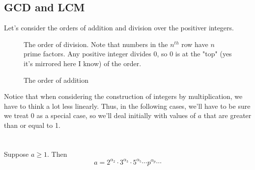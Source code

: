 \documentclass[10pt]{article}
\theoremstyle{definition}
\begin{document}
\subsection{GCD and LCM}
Let's consider the orders of addition and division over the positiver integers.  
\begin{figure}[H]
\begin{minipage}{.5\textwidth}
\centering
{}
\caption{The order of division.  Note that numbers in the $n^{th}$ row have $n$ prime factors.  Any positive integer divides $0$, so $0$ is at the "top" (yes it's mirrored here I know) of the order.}
\end{minipage}
\begin{minipage}{.5\textwidth}
\centering
{}
\caption{The order of addition}
\end{minipage}
\end{figure}
Notice that when considering the construction of integers by multiplication, we have to think a lot less linearly.  Thus, in the following cases, we'll have to be sure we treat 0 as a special case, so we'll deal initially with values of $a$ that are greater than or equal to 1.    \\~\\~\\
Suppose $a\geq 1$.  Then 
\begin{equation}\label{eq:alpha factorization for a}
a = 2^{\alpha_2}\cdot 3^{\alpha_3} \cdot 5^{\alpha_5} \cdots p^{\alpha_p} \cdots 
\end{equation}
\end{document}
